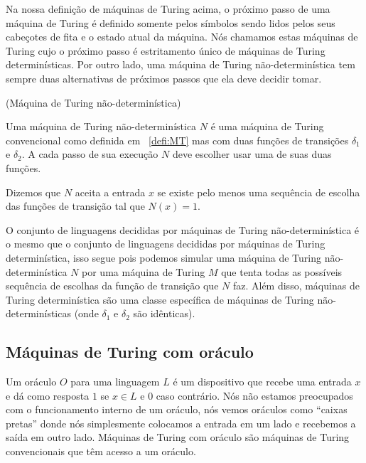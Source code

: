 Na nossa definição de máquinas de Turing acima, o próximo passo de uma máquina de Turing é definido somente pelos símbolos sendo lidos pelos seus cabeçotes de fita e o estado atual da máquina. Nós chamamos estas máquinas de Turing cujo o próximo passo é estritamento único de máquinas de Turing determinísticas. Por outro lado, uma máquina de Turing não-determinística tem sempre duas alternativas de próximos passos que ela deve decidir tomar.

\begin{defi} (Máquina de Turing não-determinística)

Uma máquina de Turing não-determinística $N$ é uma máquina de Turing convencional como definida em ~\ref{defi:MT} mas com duas funções de transições $\delta_{1}$ e $\delta_{2}$. A cada passo de sua execução $N$ deve escolher usar uma de suas duas funções.

Dizemos que $N$ aceita a entrada $x$ se existe pelo menos uma sequência de escolha das funções de transição tal que $N(x) = 1$.

\end{defi}

O conjunto de linguagens decididas por máquinas de Turing não-determinística é o mesmo que o conjunto de linguagens decididas por máquinas de Turing determinística, isso segue pois podemos simular uma máquina de Turing não-determinística $N$ por uma máquina de Turing $M$ que tenta todas as possíveis sequência de escolhas da função de transição que $N$ faz. Além disso, máquinas de Turing determinística são uma classe específica de máquinas de Turing não-determinísticas (onde $\delta_{1}$ e $\delta_{2}$ são idênticas).


\subsection{Máquinas de Turing com oráculo}

Um oráculo $O$ para uma linguagem $L$ é um dispositivo que recebe uma entrada $x$ e dá como resposta $1$ se $x \in L$ e $0$ caso contrário. Nós não estamos preocupados com o funcionamento interno de um oráculo, nós vemos oráculos como ``caixas pretas'' donde nós simplesmente colocamos a entrada em um lado e recebemos a saída em outro lado. Máquinas de Turing com oráculo são máquinas de Turing convencionais que têm acesso a um oráculo.


